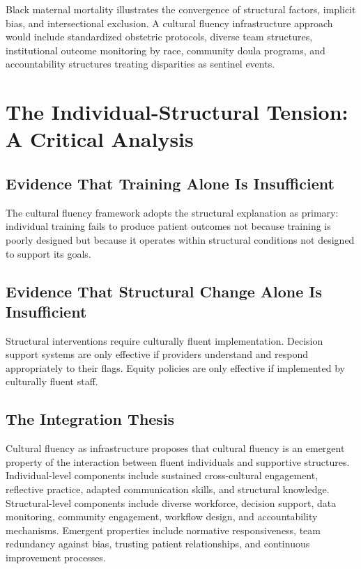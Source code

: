 \documentclass[12pt, a4paper]{article}
\begin{document}
Black maternal mortality illustrates the convergence of structural factors, implicit bias, and intersectional exclusion. A cultural fluency infrastructure approach would include standardized obstetric protocols, diverse team structures, institutional outcome monitoring by race, community doula programs, and accountability structures treating disparities as sentinel events.

\section{The Individual-Structural Tension: A Critical Analysis}

\subsection{Evidence That Training Alone Is Insufficient}

The cultural fluency framework adopts the structural explanation as primary: individual training fails to produce patient outcomes not because training is poorly designed but because it operates within structural conditions not designed to support its goals.

\subsection{Evidence That Structural Change Alone Is Insufficient}

Structural interventions require culturally fluent implementation. Decision support systems are only effective if providers understand and respond appropriately to their flags. Equity policies are only effective if implemented by culturally fluent staff.

\subsection{The Integration Thesis}

Cultural fluency as infrastructure proposes that cultural fluency is an emergent property of the interaction between fluent individuals and supportive structures. Individual-level components include sustained cross-cultural engagement, reflective practice, adapted communication skills, and structural knowledge. Structural-level components include diverse workforce, decision support, data monitoring, community engagement, workflow design, and accountability mechanisms. Emergent properties include normative responsiveness, team redundancy against bias, trusting patient relationships, and continuous improvement processes.
\end{document}
